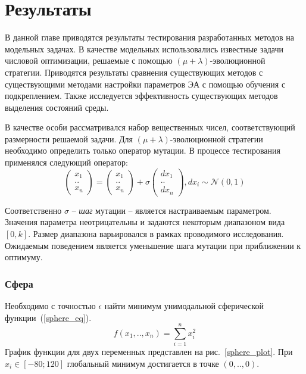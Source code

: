 \chapter{Результаты}
\label{chapter_results}

В данной главе приводятся результаты тестирования разработанных методов на модельных задачах. В качестве модельных использовались известные задачи числовой оптимизации, решаемые с помощью $(\mu + \lambda)$-эволюционной стратегии. Приводятся результаты сравнения существующих методов с существующими методами настройки параметров ЭА с помощью обучения с подкреплением. Также исследуется эффективность существующих методов выделения состояний среды.

В качестве особи рассматривался набор вещественных чисел, соответствующий размерности решаемой задачи. Для $(\mu + \lambda)$-эволюционной стратегии необходимо определить только оператор мутации. В процессе тестирования применялся следующий оператор:
\begin{equation}
 \begin{pmatrix} x_1 \\ .. \\ x_n \end{pmatrix} = \begin{pmatrix} x_1 \\ .. \\ x_n \end{pmatrix} + \sigma \begin{pmatrix}dx_1 \\ .. \\ dx_n\end{pmatrix}, dx_i \sim \mathcal{N}(0, 1)
\end{equation}

Соответственно $\sigma$ -- \textit{шаг} мутации -- является настраиваемым параметром. Значения параметра неотрицательны и задаются некоторым диапазоном вида $[0, k]$. Размер диапазона варьировался в рамках проводимого исследования. Ожидаемым поведением является уменьшение шага мутации при приближении к оптимуму.

\subsection{Сфера}

Необходимо с точностью $\epsilon$ найти минимум унимодальной сферической функции~(\ref{sphere_eq}).
\begin{equation}
\label{sphere_eq}
f(x_1,..,x_n) = \sum\limits_{i=1}^n{x_i^2}
\end{equation}
График функции для двух переменных представлен на рис.~\ref{sphere_plot}. При $x_i \in [-80; 120]$ глобальный минимум достигается в точке $(0,..,0)$.

